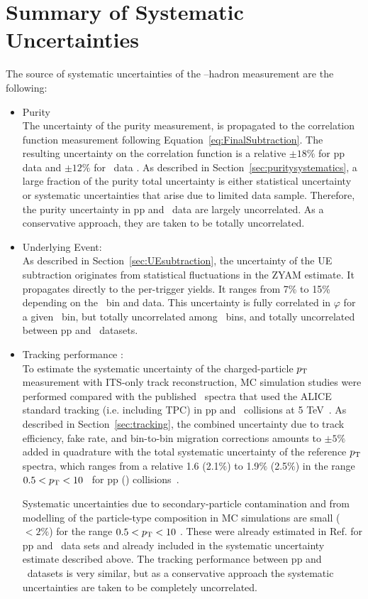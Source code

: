 \section{Summary of Systematic Uncertainties}
The source of systematic uncertainties of the \gammaiso--hadron measurement are the following:
\begin{itemize}
    \item Purity\\
The uncertainty of the purity measurement, is propagated to the correlation function measurement following Equation~\ref{eq:FinalSubtraction}. The resulting uncertainty on the correlation function is a relative $\pm18\%$ for pp data and  $\pm12\%$ for \pPb~data . As described in Section~\ref{sec:puritysystematics}, a large fraction of the purity total uncertainty is either statistical uncertainty or systematic uncertainties that arise due to limited data sample. Therefore, the purity uncertainty in pp and \pPb~data are largely uncorrelated. As a conservative approach, they are taken to be totally uncorrelated.

\item	Underlying Event:\\
As described in Section~\ref{sec:UEsubtraction}, the uncertainty of the UE subtraction originates from statistical fluctuations in the ZYAM estimate. It propagates directly to the per-trigger yields. It ranges from 7\% to 15\% depending on the \zt~bin and data. This uncertainty is fully correlated in $\varphi$ for a given \zt~bin, but totally uncorrelated among \zt~bins, and totally uncorrelated between pp and \pPb~datasets.

\item Tracking performance :\\
To estimate the systematic uncertainty of the charged-particle $p_{\mathrm{T}}$ measurement with ITS-only track reconstruction, MC simulation studies were performed compared with the published \pt~spectra that used the ALICE standard tracking (i.e. including TPC) in pp and \pPb~collisions at 5 TeV~\cite{Acharya:2018qsh}. As described in Section~\ref{sec:tracking}, the combined uncertainty due to track efficiency, fake rate, and bin-to-bin migration corrections amounts to $\pm5\%$ added in quadrature with the total systematic uncertainty of the reference $p_{\mathrm{T}}$ spectra, which ranges from a relative 1.6 (2.1$\%$) to 1.9$\%$ (2.5$\%$) in the range $0.5<p_{\mathrm{T}}<10$ \GeVc~for pp (\pPb) collisions~\cite{Acharya:2018qsh}. 

Systematic uncertainties due to secondary-particle contamination and from modelling of the particle-type composition in MC simulations are small ($<2\%$) for the range $0.5<p_{\mathrm{T}}<10$ \GeVc. These were already estimated in Ref.\cite{Acharya:2018qsh} for pp and \pPb~data sets and already included in the systematic uncertainty estimate described above. The tracking performance between pp and \pPb~datasets is very similar, but as a conservative approach the systematic uncertainties are taken to be completely uncorrelated.



\end{itemize}
